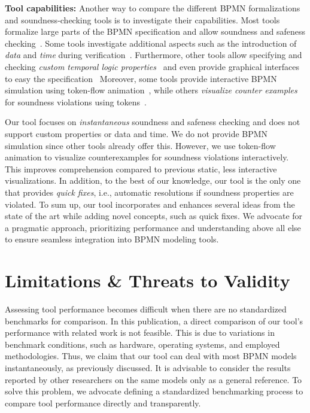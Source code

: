 \documentclass[runningheads]{llncs}
\begin{document}
\textbf{Tool capabilities:}
Another way to compare the different BPMN formalizations and soundness-checking tools is to investigate their capabilities.
Most tools formalize large parts of the BPMN specification and allow soundness and safeness checking~\cite{corradiniFormalApproachAnalysis2021,houhouFirstOrderLogicVerification2022,krauterFormalizationAnalysisBPMN2023,krauterHigherorderTransformationApproach2023}.
Some tools investigate additional aspects such as the introduction of \textit{data} and \textit{time} during verification~\cite{corradiniFormalisingAnimatingMultiple2022,houhouFirstOrderLogicVerification2022}.
Furthermore, other tools allow specifying and checking \textit{custom temporal logic properties}~\cite{corradiniFormalApproachAnalysis2021,krauterFormalizationAnalysisBPMN2023} and even provide graphical interfaces to easy the specification~\cite{krauterHigherorderTransformationApproach2023}
Moreover, some tools provide interactive BPMN simulation using token-flow animation~\cite{camundaservicesgmbhBpmnjsTokenSimulation2024,corradiniFormalisingAnimatingMultiple2022}, while others \textit{visualize counter examples} for soundness violations using tokens~\cite{houhouFirstOrderLogicVerification2022}.

Our tool focuses on \textit{instantaneous} soundness and safeness checking and does not support custom properties or data and time.
We do not provide BPMN simulation since other tools already offer this.
However, we use token-flow animation to visualize counterexamples for soundness violations interactively.
This improves comprehension compared to previous static, less interactive visualizations.
In addition, to the best of our knowledge, our tool is the only one that provides \textit{quick fixes}, i.e., automatic resolutions if soundness properties are violated.
To sum up, our tool incorporates and enhances several ideas from the state of the art while adding novel concepts, such as quick fixes.
We advocate for a pragmatic approach, prioritizing performance and understanding above all else to ensure seamless integration into BPMN modeling tools.

\section{Limitations \& Threats to Validity} \label{sec:limitations}
Assessing tool performance becomes difficult when there are no standardized benchmarks for comparison.
In this publication, a direct comparison of our tool's performance with related work is not feasible.
This is due to variations in benchmark conditions, such as hardware, operating systems, and employed methodologies.
Thus, we claim that our tool can deal with most BPMN models instantaneously, as previously discussed.
It is advisable to consider the results reported by other researchers on the same models only as a general reference.
To solve this problem, we advocate defining a standardized benchmarking process to compare tool performance directly and transparently.
\end{document}
